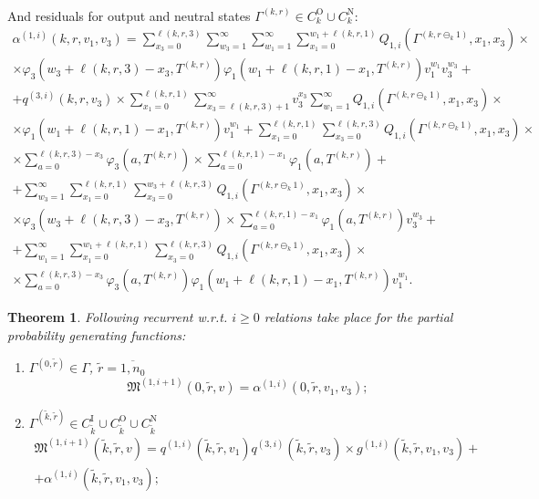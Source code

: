 \documentclass[60x84/16,10pt]{dccn}
\newtheorem{theorem}{Theorem}[section]
\begin{document}
{\begin{multline*}
\end{multline*}
And residuals for output and neutral states $\Gamma^{(k,r)}\! \in C_{k}^{\mathrm{O}} \!\cup\! C_{k}^{\mathrm{N}}$:
\begin{multline*}
\alpha^{(1,i)}(k,r,v_1,v_3) = 
    \sum_{x_3=0}^{\ell(k,r,3)}\sum_{w_3=1}^{\infty} \sum_{w_1=1}^{\infty} \sum_{x_1=0}^{w_1+\ell(k,r,1)}  Q_{1,i}(\Gamma^{(k,r\ominus_k 1)},x_1, x_3) \times  \\
   \times \varphi_3(w_3 + \ell(k,r,3) - x_3,T^{(k,r)})   \varphi_1(w_1 + \ell(k,r,1) - x_1,T^{(k,r)})  v_1^{w_1} v_3^{w_3} + \\ + q^{(3,i)}(k,r,v_3) 
    \times  \sum_{x_1=0}^{\ell(k,r,1)}\sum_{x_3=\ell(k,r,3)+1}^{\infty}
    v_3^{x_3} \sum_{w_1=1}^{\infty}  Q_{1,i}(\Gamma^{(k,r\ominus_k 1)},x_1,
    x_3)\times \\ 
    \times \!\varphi_1(w_1 + \ell(k,r,1) - x_1,T^{(k,r)})v_1^{w_1} 
   +\!\!\!\sum_{x_1=0}^{\ell(k,r,1)} \sum_{x_3=0}^{\ell(k,r,3)} \!Q_{1,i}(\Gamma^{(k,r\ominus_k 1)},x_1, x_3)\!\times \\ \times
\sum_{a=0}^{\ell(k,r,3)-x_3}\varphi_3(a,T^{(k,r)}) \times \sum_{a=0}^{\ell(k,r,1)-x_1}\varphi_1(a,T^{(k,r)})
+ \\ + 
    \sum_{w_3=1}^{\infty} \sum_{x_1=0}^{\ell(k,r,1)} \sum_{x_3=0}^{w_3 + \ell(k,r,3)} Q_{1,i}(\Gamma^{(k,r\ominus_k 1)},x_1, x_3) \times  \\ \times \varphi_3(w_3 + \ell(k,r,3) - x_3,T^{(k,r)})  \times \sum_{a=0}^{\ell(k,r,1)-x_1}\varphi_1(a,T^{(k,r)})  v_3^{w_3} + \\
    +
    \sum_{w_1=1}^{\infty} \sum_{x_1=0}^{w_1 + \ell(k,r,1) } \sum_{x_3=0}^{\ell(k,r,3)} Q_{1,i}(\Gamma^{(k,r\ominus_k 1)},x_1, x_3) \times  \\ \times \!\sum_{a=0}^{\ell(k,r,3)-x_3}\!\!\varphi_3(a,T^{(k,r)})  \varphi_1(w_1 + \ell(k,r,1) - x_1,T^{(k,r)}) v_1^{w_1}.
\end{multline*}


\begin{theorem}
Following recurrent w.r.t. $i
\geqslant 0$ relations take place for the  partial probability generating functions:
\begin{enumerate}

\item $ \Gamma^{(0,\tilde{r})} \in \Gamma$, $\tilde{r} = \overline{1,n_0}$ 
$$
\mathfrak{M}^{(1,i+1)}(0,\tilde{r},v) = \alpha^{(1,i)}(0,\tilde{r},v_1,v_3);
$$
\item $\Gamma^{(\tilde{k},\tilde{r})} \in C_{\tilde{k}}^{\mathrm{I}} \cup C_{\tilde{k}}^{\mathrm{O}} \cup C_{\tilde{k}}^{\mathrm{N}}$
\begin{multline*}
\mathfrak{M}^{(1,i+1)}(\tilde{k},\tilde{r},v) = q^{(1,i)}(\tilde{k},\tilde{r},v_1) q^{(3,i)}(\tilde{k},\tilde{r},v_3) \times g^{(1,i)}(\tilde{k},\tilde{r},v_1,v_3)
     +\\+ \alpha^{(1,i)}(\tilde{k},\tilde{r},v_1,v_3);
\end{multline*}
\end{enumerate}


\end{theorem}}
\end{document}
